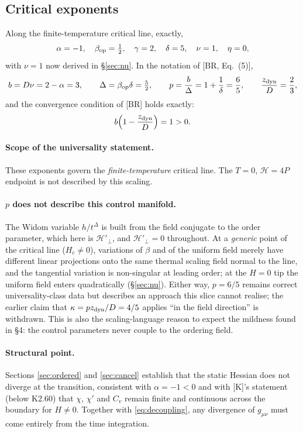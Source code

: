 \documentclass[11pt,a4paper]{article}
\newcommand{\Hc}{\mathcal{H}}
\newcommand{\Hc}{\mathcal{H}}          %
\begin{document}
\subsection{Critical exponents}
\label{sec:crit}
Along the finite-temperature critical line, exactly,
\begin{equation}
  \alpha=-1,\quad \beta_{\rm op}=\tfrac12,\quad \gamma=2,\quad \delta=5,\quad
  \nu=1,\quad \eta=0 ,
\end{equation}
with $\nu=1$ now derived in \S\ref{sec:nu}. In the notation of [BR, Eq.~(5)],
\begin{equation}
  b=D\nu=2-\alpha=3,\qquad
  \Delta=\beta_{\rm op}\delta=\tfrac52,\qquad
  p=\frac b\Delta=1+\frac1\delta=\frac65,\qquad
  \frac{z_{\rm dyn}}{D}=\frac23 ,
\end{equation}
and the convergence condition of [BR] holds exactly:
\begin{equation}
  b\Big(1-\frac{z_{\rm dyn}}{D}\Big)=1>0 .
\end{equation}

\paragraph{Scope of the universality statement.} These exponents govern the
\emph{finite-temperature} critical line. The $T=0$, $\Hc=4P$ endpoint is not described by
this scaling.

\paragraph{$p$ does not describe this control manifold.} The Widom variable $h/t^\Delta$ is
built from the field conjugate to the order parameter, which here is $\Hc'_\perp$, and
$\Hc'_\perp=0$ throughout. At a \emph{generic} point of the critical line ($H_c\neq0$),
variations of $\beta$ and of the uniform field merely have different linear projections onto
the same thermal scaling field normal to the line, and the tangential variation is
non-singular at leading order; at the $H=0$ tip the uniform field enters quadratically
(\S\ref{sec:nu}). Either way, $p=6/5$ remains correct universality-class data but describes
an approach this slice cannot realise; the earlier claim that $\kappa=pz_{\rm dyn}/D=4/5$
applies ``in the field direction'' is withdrawn. This is also the scaling-language reason to
expect the mildness found in \S4: the control parameters never couple to the ordering field.

\paragraph{Structural point.} Sections \ref{sec:ordered} and \ref{sec:cancel} establish that
the static Hessian does not diverge at the transition, consistent with $\alpha=-1<0$ and
with [K]'s statement (below K2.60) that $\chi$, $\chi'$ and $C_v$ remain finite and
continuous across the boundary for $H\neq0$. Together with \eqref{eq:decoupling}, any
divergence of $g_{\mu\nu}$ must come entirely from the time integration.
\end{document}

